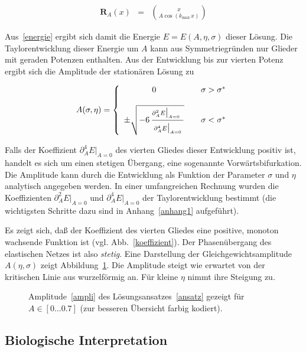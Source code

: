 \begin{eqnarray}
\mathbf{R}_A(x)&=&{\binom{x}{A\cos(k_{\text{max}}\,x)}}
\label{ansatz}
\end{eqnarray}

Aus~\eqref{energie} ergibt sich damit die Energie $E=E(A,\eta,\sigma)$
dieser Lösung.  Die Taylorentwicklung dieser Energie um $A$ kann aus
Symmetriegründen nur Glieder mit geraden Potenzen enthalten.  Aus der
Entwicklung bis zur vierten Potenz ergibt sich die Amplitude der
stationären Lösung zu

\begin{equation}
A(\sigma,\eta)=\left\{\begin{array}{cll}
0&&\sigma>\sigma^\ast\\
&&\\
\pm\sqrt{-6\,\frac{{\vrule width 0pt height 0.30cm}\partial_A^2E\big\vert_{A=0_{\phantom{g}}}}{{\vrule width 0pt height 0.4cm}\partial_A^4E\big\vert_{A=0}}}&&\sigma<\sigma^\ast
\end{array}\right.
\label{ampli}
\end{equation}

Falls der Koeffizient $\partial_A^4E\big\vert_{A=0}$ des vierten Gliedes
dieser Entwicklung positiv ist, handelt es sich um einen stetigen
Übergang, eine sogenannte Vorwärtsbifurkation.  Die Amplitude kann durch die
Entwicklung als Funktion der Parameter $\sigma$ und $\eta$ analytisch
angegeben werden.  In einer umfangreichen Rechnung wurden die Koeffizienten
$\partial_A^2E\big\vert_{A=0}$ und $\partial_A^4E\big\vert_{A=0}$ der
Taylorentwicklung bestimmt (die wichtigsten Schritte dazu sind in
Anhang~\ref{anhang1} aufgeführt).

Es zeigt sich, daß der Koeffizient des vierten Gliedes eine positive,
monoton wachsende Funktion ist (vgl. Abb.~\ref{koeffizient}). Der
Phasenübergang des elastischen Netzes ist also \emph{stetig}.  Eine
Darstellung der Gleichgewichtsamplitude $A(\eta,\sigma)$ zeigt
Abbildung~\ref{surface}. Die Amplitude steigt wie erwartet von der
kritischen Linie aus wurzelförmig an. Für kleine $\eta$ nimmt ihre
Steigung zu.

\begin{figure}[t]
\centering
{}
\caption{Amplitude~\eqref{ampli} des Lösungsansatzes~\eqref{ansatz} gezeigt
für  $A\in[0\ldots0.7]$ (zur besseren Übersicht farbig kodiert).}
\label{surface}
\end{figure}

\subsection{Biologische Interpretation}
\label{biointerpret}

